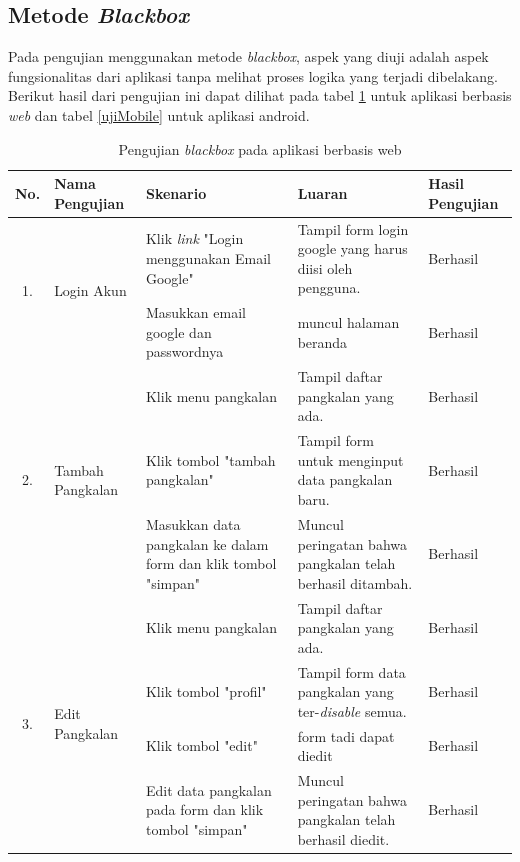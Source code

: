 	
	\subsection{Metode \textit{Blackbox}}
	
	Pada pengujian menggunakan metode \textit{blackbox}, aspek yang diuji adalah aspek fungsionalitas dari aplikasi tanpa melihat proses logika yang terjadi dibelakang. Berikut hasil dari pengujian ini dapat dilihat pada tabel \ref{ujiWeb} untuk aplikasi berbasis \textit{web} dan tabel \ref{ujiMobile} untuk aplikasi android.
	
	\newpage
	\begin{longtable}{ |c|p{3cm}|p{3cm}|p{3cm}|p{2cm}|}
	\caption{Pengujian \textit{blackbox} pada aplikasi berbasis web}
	\label{ujiWeb} \\ \hline
	\textbf{No.}                  &  \textbf{Nama Pengujian}         & \textbf{Skenario}                                       & \textbf{Luaran}              & \textbf{Hasil Pengujian} \\ \hline
	
	
	\multirow{2}{*}{1.}  & 	\multirow{2}{*}{Login Akun} & Klik \textit{link} "Login menggunakan Email Google"           & Tampil form login google yang harus diisi oleh pengguna.             & Berhasil \\ \cline{3-5}
	& & Masukkan email google dan passwordnya           & muncul halaman beranda         & Berhasil \\ \hline
	
	\multirow{3}{*}{2.}  & 	\multirow{3}{*}{Tambah Pangkalan} & Klik menu pangkalan           & Tampil daftar pangkalan yang ada.             & Berhasil \\ \cline{3-5}
	& & Klik tombol "tambah pangkalan"           & Tampil form untuk menginput data pangkalan baru.             & Berhasil \\ \cline{3-5}
	& & Masukkan data pangkalan ke dalam form dan klik tombol "simpan"           & Muncul peringatan bahwa pangkalan telah berhasil ditambah.             & Berhasil \\ \hline
	
	\multirow{4}{*}{3.}  & 	\multirow{4}{*}{Edit Pangkalan} & Klik menu pangkalan           & Tampil daftar pangkalan yang ada.             & Berhasil \\ \cline{3-5}
	& & Klik tombol "profil"           & Tampil form data pangkalan yang ter-\textit{disable} semua.             & Berhasil \\ \cline{3-5}
	& & Klik tombol "edit"           & form tadi dapat diedit             & Berhasil \\ \cline{3-5}
	& & Edit data pangkalan pada form dan klik tombol "simpan"           & Muncul peringatan bahwa pangkalan telah berhasil diedit.             & Berhasil \\ \hline
	

\end{longtable}
